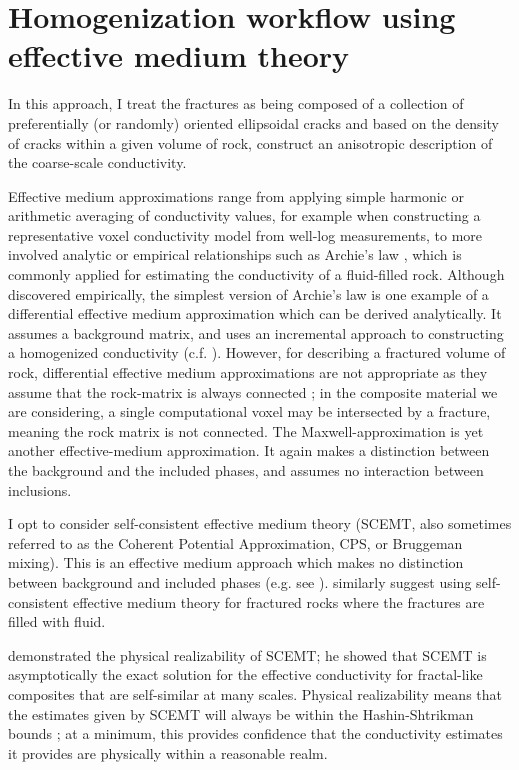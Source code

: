\section{Homogenization workflow using effective medium theory}

In this approach, I treat the fractures as being composed of a collection of preferentially (or randomly) oriented ellipsoidal cracks and based on the density of cracks within a given volume of rock, construct an anisotropic description of the coarse-scale conductivity.

Effective medium approximations range from applying simple harmonic or arithmetic averaging of conductivity values, for example when constructing a representative voxel conductivity model from well-log measurements, to more involved analytic or empirical relationships such as Archie's law \citep{Archie1942}, which is commonly applied for estimating the conductivity of a fluid-filled rock. Although discovered empirically, the simplest version of Archie's law is one example of a differential effective medium approximation which can be derived analytically. It assumes a background matrix, and uses an incremental approach to constructing a homogenized conductivity (c.f. \cite{Torquato2002, Milton2002}). However, for describing a fractured volume of rock, differential effective medium approximations are not appropriate as they assume that the rock-matrix is always connected \citep{Torquato2002}; in the composite material we are considering, a single computational voxel may be intersected by a fracture, meaning the rock matrix is not connected. The Maxwell-approximation \citep{Maxwell1873} is yet another effective-medium approximation. It again makes a distinction between the background and the included phases, and assumes no interaction between inclusions.

I opt to consider self-consistent effective medium theory (SCEMT, also sometimes referred to as the Coherent Potential Approximation, CPS, or Bruggeman mixing). This is an effective medium approach which makes no distinction between background and included phases (e.g. see \cite{Torquato2002}). \cite{Berryman2013} similarly suggest using self-consistent effective medium theory for fractured rocks where the fractures are filled with fluid.

\cite{Milton1985} demonstrated the physical realizability of SCEMT; he showed that SCEMT is asymptotically the exact solution for the effective conductivity for fractal-like composites that are self-similar at many scales. Physical realizability means that the estimates given by SCEMT will always be within the Hashin-Shtrikman bounds \citep{Torquato2002}; at a minimum, this provides confidence that the conductivity estimates it provides are physically within a reasonable realm.

